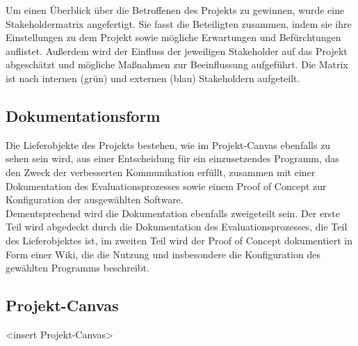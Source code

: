 \documentclass[ThesisDJ.tex]{subfiles}
\begin{document}
  Um einen Überblick über die Betroffenen des Projekts zu gewinnen, wurde eine Stakeholdermatrix angefertigt. Sie fasst die Beteiligten zusammen, indem sie ihre Einstellungen zu dem Projekt sowie mögliche Erwartungen und Befürchtungen auflistet. Außerdem wird der Einfluss der jeweiligen Stakeholder auf das Projekt abgeschätzt und mögliche Maßnahmen zur Beeinflussung aufgeführt. Die Matrix ist nach internen (grün) und externen (blau) Stakeholdern aufgeteilt. 

	
	\subsection{Dokumentationsform}
	
	Die Lieferobjekte des Projekts bestehen, wie im Projekt-Canvas ebenfalls zu sehen sein wird, aus einer Entscheidung für ein einzusetzendes Programm, das den Zweck der verbesserten Kommunikation erfüllt, zusammen mit einer Dokumentation des Evaluationsprozesses sowie einem Proof of Concept zur Konfiguration der ausgewählten Software.\\
	Dementsprechend wird die Dokumentation ebenfalls zweigeteilt sein. Der erste Teil wird abgedeckt durch die Dokumentation des Evaluationsprozesses, die Teil des Lieferobjektes ist, im zweiten Teil wird der Proof of Concept dokumentiert in Form einer Wiki, die die Nutzung und insbesondere die Konfiguration des gewählten Programms beschreibt. 
	
	\subsection{Projekt-Canvas}
	<insert Projekt-Canvas>
\end{document}
